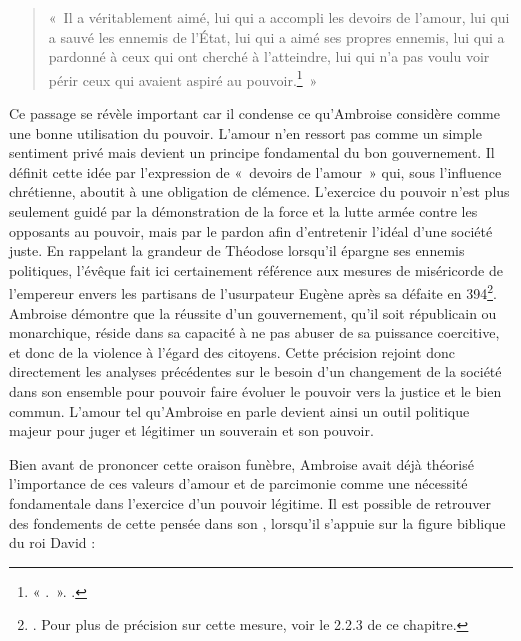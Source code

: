 \begin{quote}
    «~Il a véritablement aimé, lui qui a accompli les devoirs de l’amour, lui qui a sauvé les ennemis de l’État, lui qui a aimé ses propres ennemis, lui qui a pardonné à ceux qui ont cherché à l’atteindre, lui qui n’a pas voulu voir périr ceux qui avaient aspiré au pouvoir.\footnote{« .~». \cite[]{ambroise_mort_theodose}.}~»
\end{quote}

\bigskip

Ce passage se révèle important car il condense ce qu'Ambroise considère comme une bonne utilisation du pouvoir. L'amour n'en ressort pas comme un simple sentiment privé mais devient un principe fondamental du bon gouvernement. Il définit cette idée par l'expression de «~devoirs de l'amour~» qui, sous l'influence chrétienne, aboutit à une obligation de clémence. L'exercice du pouvoir n'est plus seulement guidé par la démonstration de la force et la lutte armée contre les opposants au pouvoir, mais par le pardon afin d'entretenir l'idéal d'une société juste. En rappelant la grandeur de Théodose lorsqu'il épargne ses ennemis politiques, l'évêque fait ici certainement référence aux mesures de miséricorde de l'empereur envers les partisans de l'usurpateur Eugène après sa défaite en 394\footnote{\cite{pottier_mort}. Pour plus de précision sur cette mesure, voir le 2.2.3 de ce chapitre.}. Ambroise démontre que la réussite d'un gouvernement, qu'il soit républicain ou monarchique, réside dans sa capacité à ne pas abuser de sa puissance coercitive, et donc de la violence à l'égard des citoyens. Cette précision rejoint donc directement les analyses précédentes sur le besoin d'un changement de la société dans son ensemble pour pouvoir faire évoluer le pouvoir vers la justice et le bien commun. L'amour tel qu'Ambroise en parle devient ainsi un outil politique majeur pour juger et légitimer un souverain et son pouvoir.

\bigskip

Bien avant de prononcer cette oraison funèbre, Ambroise avait déjà théorisé l'importance de ces valeurs d'amour et de parcimonie comme une nécessité fondamentale dans l'exercice d'un pouvoir légitime. Il est possible de retrouver des fondements de cette pensée dans son , lorsqu'il s'appuie sur la figure biblique du roi David :

